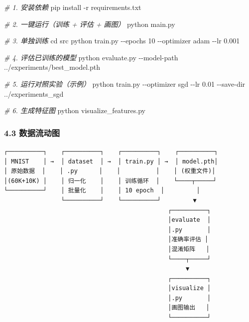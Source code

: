 \documentclass[
  11pt,
]{ctexart}
\newenvironment{Shaded}{}{}
\newcommand{\AttributeTok}[1]{\textcolor[rgb]{0.49,0.56,0.16}{#1}}
\newcommand{\BuiltInTok}[1]{\textcolor[rgb]{0.00,0.50,0.00}{#1}}
\newcommand{\CommentTok}[1]{\textcolor[rgb]{0.38,0.63,0.69}{\textit{#1}}}
\newcommand{\ExtensionTok}[1]{#1}
\newcommand{\NormalTok}[1]{#1}
\begin{document}
\begin{Shaded}
\begin{Highlighting}[]
\CommentTok{\# 1. 安装依赖}
\ExtensionTok{pip}\NormalTok{ install }\AttributeTok{{-}r}\NormalTok{ requirements.txt}

\CommentTok{\# 2. 一键运行（训练 + 评估 + 画图）}
\ExtensionTok{python}\NormalTok{ main.py}

\CommentTok{\# 3. 单独训练}
\BuiltInTok{cd}\NormalTok{ src}
\ExtensionTok{python}\NormalTok{ train.py }\AttributeTok{{-}{-}epochs}\NormalTok{ 10 }\AttributeTok{{-}{-}optimizer}\NormalTok{ adam }\AttributeTok{{-}{-}lr}\NormalTok{ 0.001}

\CommentTok{\# 4. 评估已训练的模型}
\ExtensionTok{python}\NormalTok{ evaluate.py }\AttributeTok{{-}{-}model{-}path}\NormalTok{ ../experiments/best\_model.pth}

\CommentTok{\# 5. 运行对照实验（示例）}
\ExtensionTok{python}\NormalTok{ train.py }\AttributeTok{{-}{-}optimizer}\NormalTok{ sgd }\AttributeTok{{-}{-}lr}\NormalTok{ 0.01 }\AttributeTok{{-}{-}save{-}dir}\NormalTok{ ../experiments\_sgd}

\CommentTok{\# 6. 生成特征图}
\ExtensionTok{python}\NormalTok{ visualize\_features.py}
\end{Highlighting}
\end{Shaded}

\subsubsection{4.3 数据流动图}\label{ux6570ux636eux6d41ux52a8ux56fe}

\begin{verbatim}
┌──────────┐    ┌──────────┐    ┌──────────┐    ┌──────────┐
│ MNIST    │ →  │ dataset  │ →  │ train.py │ →  │ model.pth│
│ 原始数据  │    │ .py      │    │          │    │ (权重文件)│
│(60K+10K) │    │ 归一化    │    │ 训练循环  │    └────┬─────┘
└──────────┘    │ 批量化    │    │ 10 epoch  │         │
                └──────────┘    └──────────┘         ▼
                                              ┌──────────┐
                                              │evaluate  │
                                              │.py       │
                                              │准确率评估 │
                                              │混淆矩阵   │
                                              └────┬─────┘
                                                   ▼
                                              ┌──────────┐
                                              │visualize │
                                              │.py       │
                                              │画图输出   │
                                              └──────────┘
\end{verbatim}
\end{document}
